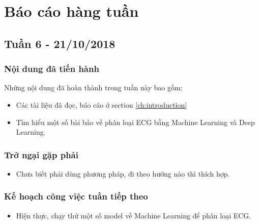 \chapter*{Báo cáo hàng tuần}
\section{Tuần 6 - 21/10/2018}
\subsection{Nội dung đã tiến hành}
Những nội dung đã hoàn thành trong tuần này bao gồm:
\begin{itemize}
\item Các tài liệu đã đọc, báo cáo ở section \ref{ch:introduction}
\item Tìm hiểu một số bài báo về phân loại ECG bằng Machine Learning và Deep Learning.
\end{itemize}

\subsection{Trở ngại gặp phải}
\begin{itemize}
    \item Chưa biết phải dùng phương pháp, đi theo hướng nào thì thích hợp.
\end{itemize}

\subsection{Kế hoạch công việc tuần tiếp theo}
\begin{itemize}
    \item Hiện thực, chạy thử một số model về Machine Learning để phân loại ECG.
\end{itemize}
